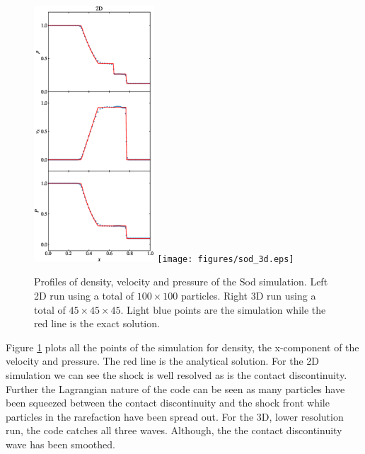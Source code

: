 \begin{figure}
    \begin{center}
        \includegraphics[width=0.4\textwidth]{figures/sod_2d.eps}
        \texttt{[image: figures/sod\_3d.eps]}
        \caption{Profiles of density, velocity and pressure of the Sod simulation. Left 2D run using 
        a total of $100\times100$ particles. Right 3D run using a total of $45\times45\times45$.
        Light blue points are the simulation while the red line is the exact solution.}
        \label{fig.sod}
    \end{center}
\end{figure}
Figure \ref{fig.sod} plots all the points of the simulation for density, the x-component of
the velocity and pressure. The red line is the analytical solution. For the 2D simulation we can see
the shock is well resolved as is the contact discontinuity. Further the Lagrangian nature of
the code can be seen as many particles have been squeezed between the contact discontinuity and the
shock front while particles in the rarefaction have been spread out. For the 3D, lower resolution
run, the code catches all three waves. Although, the the contact discontinuity wave has been
smoothed.

